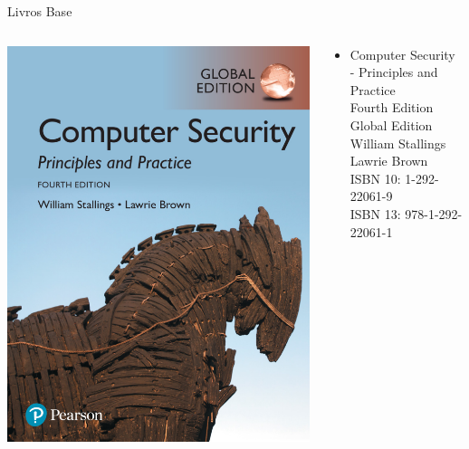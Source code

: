 \begin{frame}{Livros Base}
\centering
\begin{columns}
    \begin{column}{0.5\linewidth}
        \includegraphics[width=0.8\linewidth]{Figuras/livro-stallings-sec.png}
    \end{column}
    \begin{column}{0.5\linewidth}
        \begin{itemize}
            \item Computer Security - Principles and Practice\\
Fourth Edition \\
Global Edition \\
William Stallings \\ 
Lawrie Brown \\
ISBN 10: 1-292-22061-9\\
ISBN 13: 978-1-292-22061-1
        \end{itemize}
    \end{column}
\end{columns}

\end{frame}

